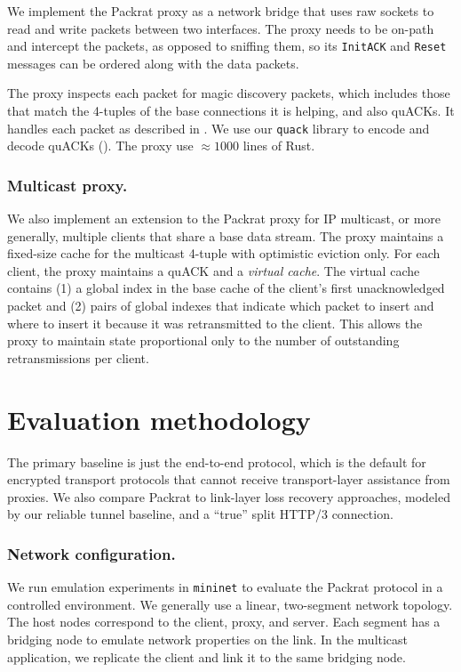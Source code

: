 We implement the Packrat proxy as a network bridge that uses raw sockets to read
and write packets between two interfaces. The proxy needs to
be on-path and intercept the packets, as opposed to sniffing them, so
its \texttt{InitACK} and \texttt{Reset} messages can be ordered along with the
data packets.

The proxy inspects each packet for magic discovery packets, which includes
those that match the 4-tuples of the base connections it is helping, and also
quACKs. It handles each packet as described in .
We use our \texttt{quack} library to encode and decode quACKs
(). The proxy use $\approx\!1000$ lines of Rust.

\subsubsection{Multicast proxy.}

We also implement an extension to the Packrat proxy for IP multicast, or more
generally, multiple clients that share a base data stream. The proxy maintains
a fixed-size cache for the multicast 4-tuple with optimistic eviction only. For
each client, the proxy maintains a quACK and a \textit{virtual cache}. The
virtual cache contains (1) a global index in the base cache of the client's
first unacknowledged packet and (2) pairs of global indexes that indicate which
packet to insert and where to insert it because it was retransmitted to the
client. This allows the proxy to maintain state proportional only to the number
of outstanding retransmissions per client.

\section{Evaluation methodology}
\label{sec:packrat:methodology}

The primary baseline is just the end-to-end protocol, which is the default for
encrypted transport protocols that cannot receive transport-layer assistance
from proxies.
We also compare Packrat to link-layer loss recovery approaches, modeled by
our reliable tunnel baseline, and a ``true'' split HTTP/3 connection.

\subsubsection{Network configuration.}

We run emulation experiments in \texttt{mininet} to evaluate the Packrat protocol
in a controlled environment. We generally use a linear, two-segment network
topology.
The host nodes
correspond to the client, proxy, and server. Each segment has a bridging
node to emulate network properties on the link. In the multicast application,
we replicate the client and link it to the same bridging node.

